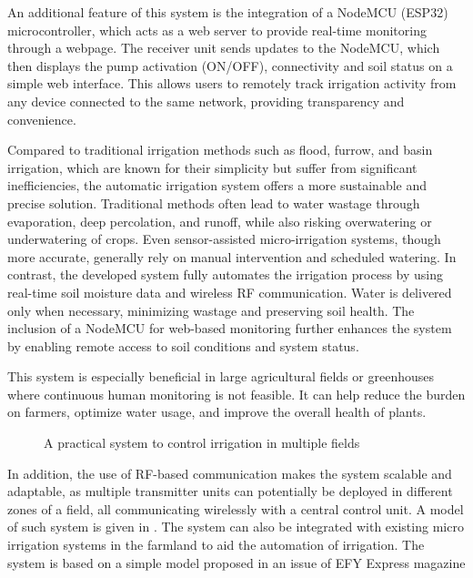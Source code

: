 An additional feature of this system is the integration of a NodeMCU (ESP32) microcontroller, which acts as a web server to provide real-time monitoring through a webpage. The receiver unit sends updates to the NodeMCU, which then displays the pump activation (ON/OFF), connectivity and soil status on a simple web interface. This allows users to remotely track irrigation activity from any device connected to the same network, providing transparency and convenience.

Compared to traditional irrigation methods such as flood, furrow, and basin irrigation, which are known for their simplicity but suffer from significant inefficiencies, the automatic irrigation system offers a more sustainable and precise solution. Traditional methods often lead to water wastage through evaporation, deep percolation, and runoff, while also risking overwatering or underwatering of crops. Even sensor-assisted micro-irrigation systems, though more accurate, generally rely on manual intervention and scheduled watering. In contrast, the developed system fully automates the irrigation process by using real-time soil moisture data and wireless RF communication. Water is delivered only when necessary, minimizing wastage and preserving soil health. The inclusion of a NodeMCU for web-based monitoring further enhances the system by enabling remote access to soil conditions and system status.

This system is especially beneficial in large agricultural fields or greenhouses where continuous human monitoring is not feasible. It can help reduce the burden on farmers, optimize water usage, and improve the overall health of plants.

\begin{figure}[ht]
  \centering
	\vspace*{.5cm}
	\vspace*{.5cm}
  \caption{A practical system to control irrigation in multiple fields}
	\label{pract-sys}
	\vspace*{.5cm}
\end{figure}


In addition, the use of RF-based communication makes the system scalable and adaptable, as multiple transmitter units can potentially be deployed in different zones of a field, all communicating wirelessly with a central control unit. A model of such system is given in . The system can also be integrated with existing micro irrigation systems in the farmland to aid the automation of irrigation. The system is based on a simple model proposed in an issue of EFY Express magazine \cite{efy}